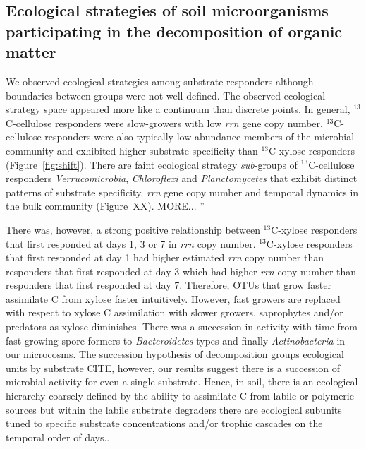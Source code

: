 \subsection{Ecological strategies of soil microorganisms participating in the
decomposition of organic matter}
We observed ecological strategies among substrate responders although
boundaries between groups were not well defined. The observed ecological
strategy space appeared more like a continuum than discrete points. In general,
$^{13}$C-cellulose responders were slow-growers with low \textit{rrn} gene copy
number. $^{13}$C-cellulose responders were also typically low abundance members
of the microbial community and exhibited higher substrate specificity than
$^{13}$C-xylose responders (Figure~\ref{fig:shift}). There are faint ecological strategy
\textit{sub}-groups of $^{13}$C-cellulose responders \textit{Verrucomicrobia},
\textit{Chloroflexi} and \textit{Planctomycetes} that exhibit distinct patterns of
substrate specificity, \textit{rrn} gene copy number and temporal dynamics in
the bulk community (Figure~XX). MORE... ''

There was, however, a strong positive relationship between $^{13}$C-xylose
responders that first responded at days 1,
3 or 7 in \textit{rrn} copy number. $^{13}$C-xylose responders that first
responded at day 1 had higher estimated \textit{rrn} copy number than
responders that first responded at day 3 which had higher \textit{rrn} copy
number than responders that first responded at day 7.  Therefore, OTUs that
grow faster assimilate C from xylose faster intuitively.  However, fast growers
are replaced with respect to xylose C assimilation with slower growers,
saprophytes and/or predators as xylose diminishes. There was a succession in
activity with time from fast growing spore-formers to \textit{Bacteroidetes}
types and finally \textit{Actinobacteria} in our microcosms. The succession
hypothesis of decomposition groups ecological units by substrate CITE, however,
our results suggest there is a succession of microbial activity for even
a single substrate. Hence, in soil, there is an ecological hierarchy coarsely
defined by the ability to assimilate C from labile or polymeric sources but
within the labile substrate degraders there are ecological subunits tuned to
specific substrate concentrations and/or trophic cascades on the temporal order
of days..

